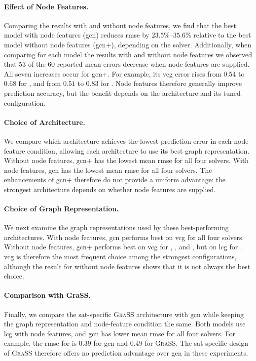 \paragraph{Effect of Node Features.}
Comparing the results with and without node features, we find that the best model with node features (\gls{gcn}) reduces \gls{rmse} by $23.5\%$--$35.6\%$ relative to the best model without node features (\gls{gcn}+), depending on the solver.
Additionally, when comparing for each model the results with and without node features we observed that 53 of the 60 reported mean errors decrease when node features are supplied. All seven increases occur for \gls{gcn}+. For example, its \gls{vcg} error rises from $0.54$ to $0.68$ for , and from $0.51$ to $0.83$ for . Node features therefore generally improve prediction accuracy, but the benefit depends on the architecture and its tuned configuration.

\paragraph{Choice of Architecture.}
We compare which architecture achieves the lowest prediction error in each node-feature condition, allowing each architecture to use its best graph representation. Without node features, \gls{gcn}+ has the lowest mean \gls{rmse} for all four solvers. With node features, \gls{gcn} has the lowest mean \gls{rmse} for all four solvers. The enhancements of \gls{gcn}+ therefore do not provide a uniform advantage: the strongest architecture depends on whether node features are supplied.

\paragraph{Choice of Graph Representation.}
We next examine the graph representations used by these best-performing architectures. With node features, \gls{gcn} performs best on \gls{vcg} for all four solvers. Without node features, \gls{gcn}+ performs best on \gls{vcg} for , , and , but on \gls{lcg} for . \gls{vcg} is therefore the most frequent choice among the strongest configurations, although the result for  without node features shows that it is not always the best choice.

\paragraph{Comparison with GraSS.}
Finally, we compare the \gls{sat}-specific \textsc{GraSS} architecture with \gls{gcn} while keeping the graph representation and node-feature condition the same. Both models use \gls{lcg} with node features, and \gls{gcn} has lower mean \gls{rmse} for all four solvers. For example, the \gls{rmse} for  is $0.39$ for \gls{gcn} and $0.49$ for \textsc{GraSS}. The \gls{sat}-specific design of \textsc{GraSS} therefore offers no prediction advantage over \gls{gcn} in these experiments.
\FloatBarrier

